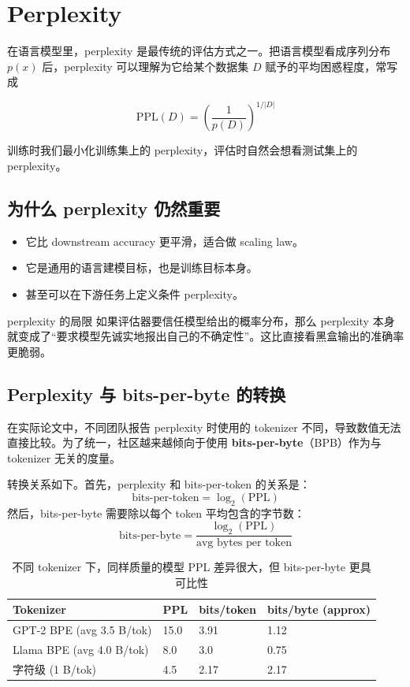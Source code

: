 \section{Perplexity}

在语言模型里，perplexity 是最传统的评估方式之一。把语言模型看成序列分布 $p(x)$ 后，perplexity 可以理解为它给某个数据集 $D$ 赋予的平均困惑程度，常写成

\[
\mathrm{PPL}(D) = \left(\frac{1}{p(D)}\right)^{1/|D|}
\]

训练时我们最小化训练集上的 perplexity，评估时自然会想看测试集上的 perplexity。

\subsection{为什么 perplexity 仍然重要}

\begin{itemize}
    \item 它比 downstream accuracy 更平滑，适合做 scaling law。
    \item 它是通用的语言建模目标，也是训练目标本身。
    \item 甚至可以在下游任务上定义条件 perplexity。
\end{itemize}

\begin{knowledgebox}{perplexity 的局限}
如果评估器要信任模型给出的概率分布，那么 perplexity 本身就变成了``要求模型先诚实地报出自己的不确定性''。这比直接看黑盒输出的准确率更脆弱。
\end{knowledgebox}

\subsection{Perplexity 与 bits-per-byte 的转换}

在实际论文中，不同团队报告 perplexity 时使用的 tokenizer 不同，导致数值无法直接比较。为了统一，社区越来越倾向于使用 \textbf{bits-per-byte}（BPB）作为与 tokenizer 无关的度量。

转换关系如下。首先，perplexity 和 bits-per-token 的关系是：
\[
\text{bits-per-token} = \log_2(\mathrm{PPL})
\]
然后，bits-per-byte 需要除以每个 token 平均包含的字节数：
\[
\text{bits-per-byte} = \frac{\log_2(\mathrm{PPL})}{\text{avg bytes per token}}
\]

\begin{table}[H]
\centering
\begin{tabular}{p{3.5cm}p{3.0cm}p{3.0cm}p{3.5cm}}
\toprule
\textbf{Tokenizer} & \textbf{PPL} & \textbf{bits/token} & \textbf{bits/byte (approx)} \\
\midrule
GPT-2 BPE (avg 3.5 B/tok) & 15.0 & 3.91 & 1.12 \\
Llama BPE (avg 4.0 B/tok) & 8.0 & 3.0 & 0.75 \\
字符级 (1 B/tok) & 4.5 & 2.17 & 2.17 \\
\bottomrule
\end{tabular}
\caption{不同 tokenizer 下，同样质量的模型 PPL 差异很大，但 bits-per-byte 更具可比性}
\end{table}

